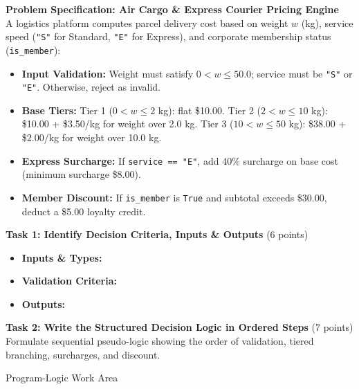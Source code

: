 \documentclass[11pt,a4paper]{article}
\begin{document}
\begin{tcolorbox}[colback=boxbg,colframe=secondaryteal,arc=1.5mm,boxrule=0.6pt,top=1.5mm,bottom=1.5mm]
\textbf{Problem Specification: Air Cargo \& Express Courier Pricing Engine}\\[0.5mm]
\small
A logistics platform computes parcel delivery cost based on weight $w$ (kg), service speed (\texttt{"S"} for Standard, \texttt{"E"} for Express), and corporate membership status (\texttt{is\_member}):
\begin{itemize}[itemsep=0.5pt,topsep=0.5pt]
  \item \textbf{Input Validation:} Weight must satisfy $0 < w \le 50.0$; service must be \texttt{"S"} or \texttt{"E"}. Otherwise, reject as invalid.
  \item \textbf{Base Tiers:} Tier 1 ($0 < w \le 2$ kg): flat \$10.00. Tier 2 ($2 < w \le 10$ kg): \$10.00 + \$3.50/kg for weight over 2.0 kg. Tier 3 ($10 < w \le 50$ kg): \$38.00 + \$2.00/kg for weight over 10.0 kg.
  \item \textbf{Express Surcharge:} If \texttt{service == "E"}, add 40\% surcharge on base cost (minimum surcharge \$8.00).
  \item \textbf{Member Discount:} If \texttt{is\_member} is \texttt{True} and subtotal exceeds \$30.00, deduct a \$5.00 loyalty credit.
\end{itemize}
\end{tcolorbox}

\vspace{0.5mm}
\textbf{Task 1: Identify Decision Criteria, Inputs \& Outputs} (6 points)
\begin{itemize}[leftmargin=2em]
  \item \textbf{Inputs \& Types:} \hrulefill\\[3mm]
  \item \textbf{Validation Criteria:} \hrulefill\\[3mm]
  \item \textbf{Outputs:} \hrulefill
\end{itemize}

\vspace{0.5mm}
\textbf{Task 2: Write the Structured Decision Logic in Ordered Steps} (7 points)\\
Formulate sequential pseudo-logic showing the order of validation, tiered branching, surcharges, and discount.

\begin{answerbox}[height=5.2cm]{Program-Logic Work Area}
\end{answerbox}
\end{document}

